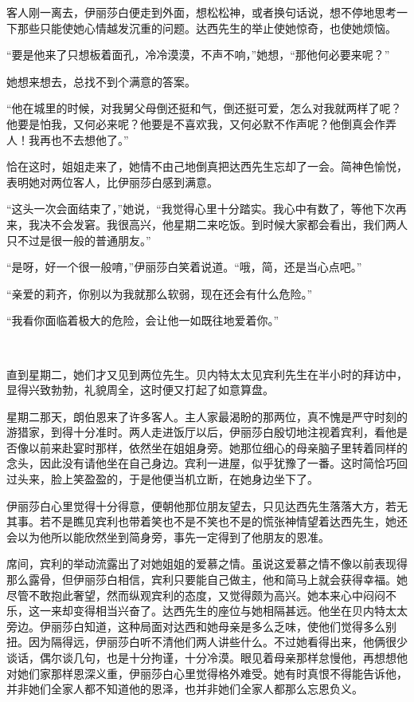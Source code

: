 \par 客人刚一离去，伊丽莎白便走到外面，想松松神，或者换句话说，想不停地思考一下那些只能使她心情越发沉重的问题。达西先生的举止使她惊奇，也使她烦恼。
\par “要是他来了只想板着面孔，冷冷漠漠，不声不响，”她想，“那他何必要来呢？”
\par 她想来想去，总找不到个满意的答案。
\par “他在城里的时候，对我舅父母倒还挺和气，倒还挺可爱，怎么对我就两样了呢？他要是怕我，又何必来呢？他要是不喜欢我，又何必默不作声呢？他倒真会作弄人！我再也不去想他了。”
\par 恰在这时，姐姐走来了，她情不由己地倒真把达西先生忘却了一会。简神色愉悦，表明她对两位客人，比伊丽莎白感到满意。
\par “这头一次会面结束了，”她说，“我觉得心里十分踏实。我心中有数了，等他下次再来，我决不会发窘。我很高兴，他星期二来吃饭。到时候大家都会看出，我们两人只不过是很一般的普通朋友。”
\par “是呀，好一个很一般唷，”伊丽莎白笑着说道。“哦，简，还是当心点吧。”
\par “亲爱的莉齐，你别以为我就那么软弱，现在还会有什么危险。”
\par “我看你面临着极大的危险，会让他一如既往地爱着你。”
\par  
\par 直到星期二，她们才又见到两位先生。贝内特太太见宾利先生在半小时的拜访中，显得兴致勃勃，礼貌周全，这时便又打起了如意算盘。
\par 星期二那天，朗伯恩来了许多客人。主人家最渴盼的那两位，真不愧是严守时刻的游猎家，到得十分准时。两人走进饭厅以后，伊丽莎白殷切地注视着宾利，看他是否像以前来赴宴时那样，依然坐在姐姐身旁。她那位细心的母亲脑子里转着同样的念头，因此没有请他坐在自己身边。宾利一进屋，似乎犹豫了一番。这时简恰巧回过头来，脸上笑盈盈的，于是他便当机立断，在她身边坐下了。
\par 伊丽莎白心里觉得十分得意，便朝他那位朋友望去，只见达西先生落落大方，若无其事。若不是瞧见宾利也带着笑也不是不笑也不是的慌张神情望着达西先生，她还会以为他所以能欣然坐到简身旁，事先一定得到了他朋友的恩准。
\par 席间，宾利的举动流露出了对她姐姐的爱慕之情。虽说这爱慕之情不像以前表现得那么露骨，但伊丽莎白相信，宾利只要能自己做主，他和简马上就会获得幸福。她尽管不敢抱此奢望，然而纵观宾利的态度，又觉得颇为高兴。她本来心中闷闷不乐，这一来却变得相当兴奋了。达西先生的座位与她相隔甚远。他坐在贝内特太太旁边。伊丽莎白知道，这种局面对达西和她母亲是多么乏味，使他们觉得多么别扭。因为隔得远，伊丽莎白听不清他们两人讲些什么。不过她看得出来，他俩很少谈话，偶尔谈几句，也是十分拘谨，十分冷漠。眼见着母亲那样怠慢他，再想想他对她们家那样恩深义重，伊丽莎白心里觉得格外难受。她有时真恨不得能告诉他，并非她们全家人都不知道他的恩泽，也并非她们全家人都那么忘恩负义。
